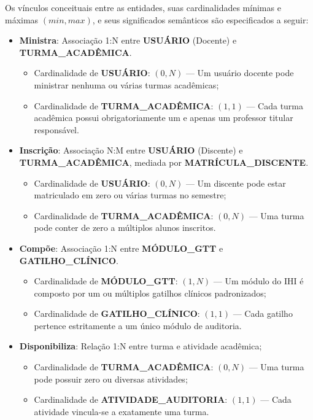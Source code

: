 Os vínculos conceituais entre as entidades, suas cardinalidades mínimas e máximas $(min, max)$, e seus significados semânticos são especificados a seguir:

\begin{itemize}
    \item \textbf{Ministra}: Associação 1:N entre \textbf{USUÁRIO} (Docente) e \textbf{TURMA\_ACADÊMICA}.
    \begin{itemize}
        \item Cardinalidade de \textbf{USUÁRIO}: $(0, N)$ --- Um usuário docente pode ministrar nenhuma ou várias turmas acadêmicas;
        \item Cardinalidade de \textbf{TURMA\_ACADÊMICA}: $(1, 1)$ --- Cada turma acadêmica possui obrigatoriamente um e apenas um professor titular responsável.
    \end{itemize}

    \item \textbf{Inscrição}: Associação N:M entre \textbf{USUÁRIO} (Discente) e \textbf{TURMA\_ACADÊMICA}, mediada por \textbf{MATRÍCULA\_DISCENTE}.
    \begin{itemize}
        \item Cardinalidade de \textbf{USUÁRIO}: $(0, N)$ --- Um discente pode estar matriculado em zero ou várias turmas no semestre;
        \item Cardinalidade de \textbf{TURMA\_ACADÊMICA}: $(0, N)$ --- Uma turma pode conter de zero a múltiplos alunos inscritos.
    \end{itemize}

    \item \textbf{Compõe}: Associação 1:N entre \textbf{MÓDULO\_GTT} e \textbf{GATILHO\_CLÍNICO}.
    \begin{itemize}
        \item Cardinalidade de \textbf{MÓDULO\_GTT}: $(1, N)$ --- Um módulo do IHI é composto por um ou múltiplos gatilhos clínicos padronizados;
        \item Cardinalidade de \textbf{GATILHO\_CLÍNICO}: $(1, 1)$ --- Cada gatilho pertence estritamente a um único módulo de auditoria.
    \end{itemize}

    \item \textbf{Disponibiliza}: Relação 1:N entre turma e atividade acadêmica;
    \begin{itemize}
        \item Cardinalidade de \textbf{TURMA\_ACADÊMICA}: $(0, N)$ --- Uma turma pode possuir zero ou diversas atividades;
        \item Cardinalidade de \textbf{ATIVIDADE\_AUDITORIA}: $(1, 1)$ --- Cada atividade vincula-se a exatamente uma turma.
    \end{itemize}


\end{itemize}
